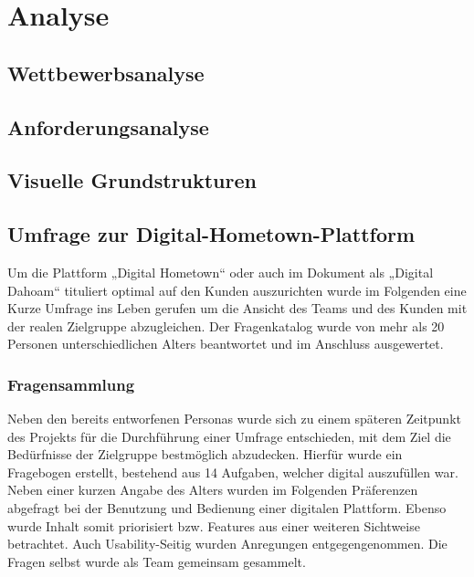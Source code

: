 \chapter{Analyse}
\label{ch:analysis}

\section{Wettbewerbsanalyse}
\label{sec:competitionanalysis}


\section{Anforderungsanalyse}
\label{sec:requirementanalysis}


\section{Visuelle Grundstrukturen}
\label{sec:visualstructure}



\section{Umfrage zur Digital-Hometown-Plattform}
\label{sec:umfrage}

Um die Plattform „Digital Hometown“ oder auch im Dokument als „Digital Dahoam“ tituliert optimal auf den Kunden auszurichten wurde im Folgenden eine Kurze Umfrage ins Leben gerufen um die Ansicht des Teams und des Kunden mit der realen Zielgruppe abzugleichen. Der Fragenkatalog wurde von mehr als 20 Personen unterschiedlichen Alters beantwortet und im Anschluss ausgewertet.

\subsection{Fragensammlung}

Neben den bereits entworfenen Personas wurde sich zu einem späteren Zeitpunkt des Projekts für die Durchführung einer Umfrage entschieden, mit dem Ziel die Bedürfnisse der Zielgruppe bestmöglich abzudecken. Hierfür wurde ein Fragebogen erstellt, bestehend aus 14 Aufgaben, welcher digital auszufüllen war. Neben einer kurzen Angabe des Alters wurden im Folgenden Präferenzen abgefragt bei der Benutzung und Bedienung einer digitalen Plattform. Ebenso wurde Inhalt somit priorisiert bzw. Features aus einer weiteren Sichtweise betrachtet. Auch Usability-Seitig wurden Anregungen entgegengenommen. Die Fragen selbst wurde als Team gemeinsam gesammelt.

